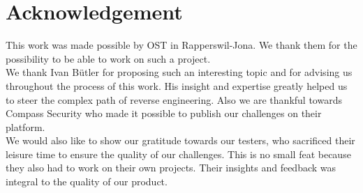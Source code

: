 \chapter*{Acknowledgement}

This work was made possible by OST in Rapperswil-Jona. We thank them for the possibility to be able to work on such a project. \\

We thank Ivan Bütler for proposing such an interesting topic and for advising us throughout the process of this work. His insight and expertise greatly helped us to steer the complex path of reverse engineering. Also we are thankful towards Compass Security who made it possible to publish our challenges on their platform.  \\

We would also like to show our gratitude towards our testers, who sacrificed their leisure time to ensure the quality of our challenges. This is no small feat because they also had to work on their own projects. Their insights and feedback was integral to the quality of our product.
